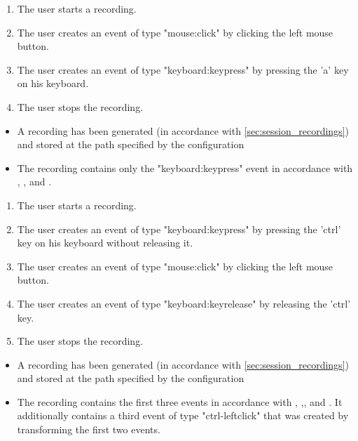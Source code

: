 \begin{tests}
    {\begin{enumerate}
        \item The \gls{user} starts a recording.
        \item The \gls{user} creates an \gls{event} of type "mouse:click" by clicking the left mouse button.
        \item The \gls{user} creates an \gls{event} of type "keyboard:keypress" by pressing the 'a' key on his keyboard.
        \item The \gls{user} stops the recording.
    \end{enumerate}}
    {\begin{itemize}
        \item A recording has been generated (in accordance with \ref{sec:session_recordings}) and stored at the path specified by the configuration
        \item The recording contains only the "keyboard:keypress" event in accordance with , ,  and .
    \end{itemize}}

    {\begin{enumerate}
        \item The \gls{user} starts a recording.
        \item The \gls{user} creates an \gls{event} of type "keyboard:keypress" by pressing the 'ctrl' key on his keyboard without releasing it.
        \item The \gls{user} creates an \gls{event} of type "mouse:click" by clicking the left mouse button.
        \item The \gls{user} creates an \gls{event} of type "keyboard:keyrelease" by releasing the 'ctrl' key.
        \item The \gls{user} stops the recording.
    \end{enumerate}}
    {\begin{itemize}
        \item A recording has been generated (in accordance with \ref{sec:session_recordings}) and stored at the path specified by the configuration
        \item The recording contains the first three events in accordance with , ,, and . It additionally contains a third event of type "ctrl-leftclick" that was created by transforming the first two \glspl{event}.
    \end{itemize}}


\end{tests}
